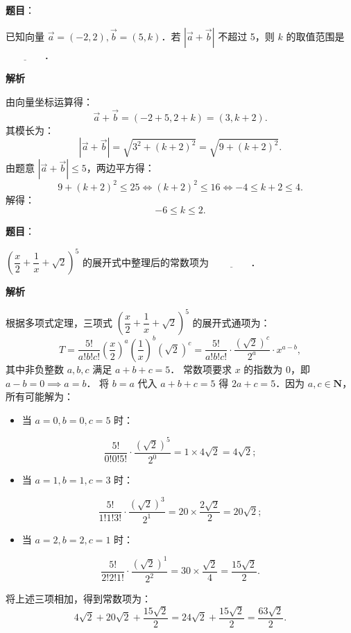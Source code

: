 \begin{answer}

\textbf{题目}：

已知向量 $\vec{a} = (-2, 2), \vec{b} = (5, k)$．若 $|\vec{a} + \vec{b}|$ 不超过 5，则 $k$ 的取值范围是 $\underline{\qquad\qquad}$．

\textbf{解析}

由向量坐标运算得：
\nopagebreak[4]
\[
\vec{a} + \vec{b} = (-2 + 5, 2 + k) = (3, k + 2).
\]
其模长为：
\nopagebreak[4]
\[
|\vec{a} + \vec{b}| = \sqrt{3^2 + (k + 2)^2} = \sqrt{9 + (k + 2)^2}.
\]
由题意 $|\vec{a} + \vec{b}| \leqslant 5$，两边平方得：
\nopagebreak[4]
\[
9 + (k + 2)^2 \leqslant 25 \iff (k + 2)^2 \leqslant 16 \iff -4 \leqslant k + 2 \leqslant 4.
\]
解得：
\nopagebreak[4]
\[
-6 \leqslant k \leqslant 2.
\]


\end{answer}
\begin{answer}

\textbf{题目}：

$\left(\dfrac{x}{2} + \dfrac{1}{x} + \sqrt{2}\right)^5$ 的展开式中整理后的常数项为 $\underline{\qquad\qquad}$．

\textbf{解析}

根据多项式定理，三项式 $\left(\dfrac{x}{2} + \dfrac{1}{x} + \sqrt{2}\right)^5$ 的展开式通项为：
\nopagebreak[4]
\[
T = \frac{5!}{a! b! c!} \left(\frac{x}{2}\right)^a \left(\frac{1}{x}\right)^b (\sqrt{2})^c = \frac{5!}{a! b! c!} \cdot \frac{(\sqrt{2})^c}{2^a} \cdot x^{a - b},
\]
其中非负整数 $a, b, c$ 满足 $a + b + c = 5$．
常数项要求 $x$ 的指数为 0，即 $a - b = 0 \implies a = b$．
将 $b = a$ 代入 $a + b + c = 5$ 得 $2a + c = 5$．因为 $a, c \in \mathbf{N}$，所有可能解为：
\begin{itemize}
\item 当 $a = 0, b = 0, c = 5$ 时：
\end{itemize}
\nopagebreak[4]
\[
\frac{5!}{0! 0! 5!} \cdot \frac{(\sqrt{2})^5}{2^0} = 1 \times 4\sqrt{2} = 4\sqrt{2};
\]
\begin{itemize}
\item 当 $a = 1, b = 1, c = 3$ 时：
\end{itemize}
\nopagebreak[4]
\[
\frac{5!}{1! 1! 3!} \cdot \frac{(\sqrt{2})^3}{2^1} = 20 \times \frac{2\sqrt{2}}{2} = 20\sqrt{2};
\]
\begin{itemize}
\item 当 $a = 2, b = 2, c = 1$ 时：
\end{itemize}
\nopagebreak[4]
\[
\frac{5!}{2! 2! 1!} \cdot \frac{(\sqrt{2})^1}{2^2} = 30 \times \frac{\sqrt{2}}{4} = \frac{15\sqrt{2}}{2}.
\]

将上述三项相加，得到常数项为：
\nopagebreak[4]
\[
4\sqrt{2} + 20\sqrt{2} + \frac{15\sqrt{2}}{2} = 24\sqrt{2} + \frac{15\sqrt{2}}{2} = \frac{63\sqrt{2}}{2}.
\]


\end{answer}
